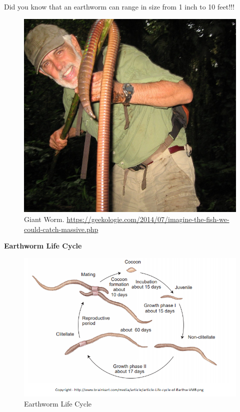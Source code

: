\documentclass[
]{book}
\begin{document}
Did you know that an earthworm can range in size from 1 inch to 10 feet!!!

\begin{figure}
\centering
\includegraphics{images/Lab4_giant_worm.png}
\caption{Giant Worm. \url{https://geekologie.com/2014/07/imagine-the-fish-we-could-catch-massive.php}}
\end{figure}

\textbf{Earthworm Life Cycle}

\begin{figure}
\centering
\includegraphics{images/Lab4_earthworm_life_cycle.png}
\caption{Earthworm Life Cycle}
\end{figure}
\end{document}
